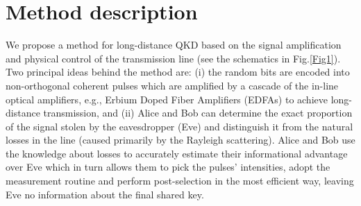 \documentclass[a4paper]{article}
\begin{document}
\section{Method description}

We propose a method for long-distance QKD based on the signal amplification and physical control of the transmission line (see the schematics in Fig.\ref{Fig1}).
Two principal ideas behind the method are: (i) the random bits are encoded into non-orthogonal coherent pulses which are amplified by a cascade of the in-line optical amplifiers, e.g., Erbium Doped Fiber Amplifiers (EDFAs) to achieve long-distance transmission, and (ii) Alice and Bob can determine the exact proportion of the signal stolen by the eavesdropper (Eve) and distinguish it from the natural losses in the line (caused primarily by the Rayleigh scattering).
Alice and Bob use the knowledge about losses to accurately estimate their informational advantage over Eve which in turn allows them to pick the pulses' intensities, adopt the measurement routine and perform post-selection in the most efficient way, leaving Eve no information about the final shared key.
\end{document}
